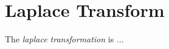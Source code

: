 \section{Laplace Transform}
\begin{definition}\label{def:Laplace Transform}
  The \emph{laplace transformation} is ...
\end{definition}

